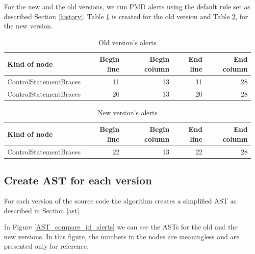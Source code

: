 \documentclass[
]{article}
\begin{document}
For the new and the old versions, we run PMD alerts using the default
rule set as described Section \ref{history}. Table \ref{old_alerts} is
created for the old version and Table \ref{new_alerts}, for the new
version.

\small

\begin{table}[H]

\caption{\label{tab:unnamed-chunk-3}Old version's alerts\label{old_alerts}}
\centering
\begin{tabular}[t]{l|r|r|r|r}
\hline
Kind of node & Begin line & Begin column & End line & End column\\
\hline
\rowcolor{gray!6}  ControlStatementBraces & 11 & 13 & 11 & 28\\
\hline
ControlStatementBraces & 20 & 13 & 20 & 28\\
\hline
\end{tabular}
\end{table}

\normalsize

\small

\begin{table}[H]

\caption{\label{tab:unnamed-chunk-4}New version's alerts\label{new_alerts}}
\centering
\begin{tabular}[t]{l|r|r|r|r}
\hline
Kind of node & Begin line & Begin column & End line & End column\\
\hline
\rowcolor{gray!6}  ControlStatementBraces & 22 & 13 & 22 & 28\\
\hline
\end{tabular}
\end{table}

\normalsize

\subsection{Create AST for each version}

For each version of the source code the algorithm creates a simplified
AST as described in Section \ref{ast}.

In Figure \ref{AST_compare_id_alerts} we can see the ASTs for the old
and the new versions. In this figure, the numbers in the nodes are
meaningless and are presented only for reference.

\small
\end{document}
